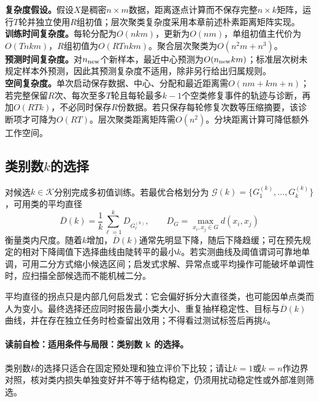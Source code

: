 \begin{complexitybox}
\textbf{复杂度假设。}假设$X$是稠密$n\times m$数据，距离逐点计算而不保存完整$n\times k$矩阵，运行$T$轮并独立使用$R$组初值；层次聚类复杂度采用本章前述朴素距离矩阵实现。\\
\textbf{训练时间复杂度。}\kMeans{}每轮分配为$O(nkm)$，更新为$O(nm)$，单组初值主代价为$O(Tnkm)$，$R$组初值为$O(RTnkm)$。聚合层次聚类为$O(n^2m+n^3)$。\\
\textbf{预测时间复杂度。}对$n_{\rm new}$个新样本，\kMeans{}最近中心预测为$O(n_{\rm new}km)$；标准层次树未规定样本外预测，因此其预测复杂度不适用，除非另行给出归属规则。\\
\textbf{空间复杂度。}\kMeans{}单次启动保存数据、中心、分配和最近距离需$O(nm+km+n)$；若完整保留$R$次、每次至多$T$轮且每轮最多$k-1$个空类修复事件的轨迹与诊断，再加$O(RTk)$，不必同时保存$R$份数据。若只保存每轮修复次数等压缩摘要，该诊断项才可降为$O(RT)$。层次聚类距离矩阵需$O(n^2)$。分块距离计算可降低\kMeans{}额外工作空间。
\end{complexitybox}

\subsection*{类别数$k$的选择}
对候选$k\in\mathcal K$分别完成多初值训练。若最优合格划分为
$\mathcal G(k)=\{G_1^{(k)},\ldots,G_k^{(k)}\}$，可用类的平均直径
\[
\overline D(k)=\frac1k\sum_{\ell=1}^{k}D_{G_\ell^{(k)}},
\qquad
D_G=\max_{x_i,x_j\in G}d(x_i,x_j)
\]
衡量类内尺度。随着$k$增加，$\overline D(k)$通常先明显下降，随后下降趋缓；可在预先规定的相对下降阈值下选择曲线由陡转平的最小$k$。若实测曲线及阈值谓词可靠地单调，可用二分方式缩小候选区间；启发式求解、异常点或平均操作可能破坏单调性时，应扫描全部候选而不能机械二分。

平均直径的拐点只是内部几何启发式：它会偏好拆分大直径类，也可能因单点类而人为变小。最终选择还应同时报告最小类大小、重复抽样稳定性、目标与$\overline D(k)$曲线，并在存在独立任务时检查留出效用；不得看过测试标签后再挑$k$。

\label{struct:V4-C02-CH28}
\paragraph{读前自检：适用条件与局限：类别数 k 的选择。}类别数$k$的选择只适合在固定预处理和独立评价下比较；请让$k=1$或$k=n$作边界对照，核对类内损失单独变好并不等于结构稳定，仍须用扰动稳定性或外部准则筛选。\par

